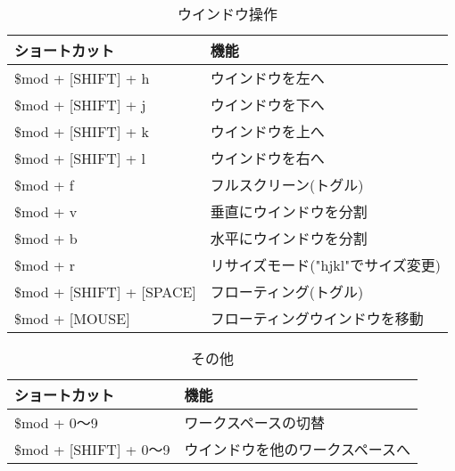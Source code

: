 \documentclass[a4j, landscape, twocolumn, dvipdfmx]{jsarticle}
\begin{document}
\begin{table}[htb] 
  \begin{center}
    \caption{ウインドウ操作}
    \begin{tabular}{|l|l|} \hline
      ショートカット & 機能 \\ \hline \hline
      \$mod + [SHIFT] + h & ウインドウを左へ\footnotemark[2] \\ \hline
      \$mod + [SHIFT] + j & ウインドウを下へ\footnotemark[2] \\ \hline
      \$mod + [SHIFT] + k & ウインドウを上へ\footnotemark[2] \\ \hline
      \$mod + [SHIFT] + l & ウインドウを右へ\footnotemark[2] \\ \hline \hline
      \$mod + f & フルスクリーン(トグル) \\ \hline
      \$mod + v & 垂直にウインドウを分割 \\ \hline
      \$mod + b & 水平にウインドウを分割 \\ \hline
      \$mod + r & リサイズモード("hjkl"でサイズ変更)\footnotemark[2] \\ \hline \hline
      \$mod + [SHIFT] + [SPACE] & フローティング(トグル) \\ \hline
      \$mod + [MOUSE] & フローティングウインドウを移動 \\ \hline
    \end{tabular}
  \end{center}
\end{table}

\begin{table}[htb]
  \begin{center}
    \caption{その他}
    \begin{tabular}{|l|l|} \hline
      ショートカット & 機能 \\ \hline \hline
      \$mod + 0〜9 & ワークスペースの切替 \\ \hline
      \$mod + [SHIFT] + 0〜9 & ウインドウを他のワークスペースへ \\ \hline
    \end{tabular}
  \end{center}
\end{table}

\end{document}
